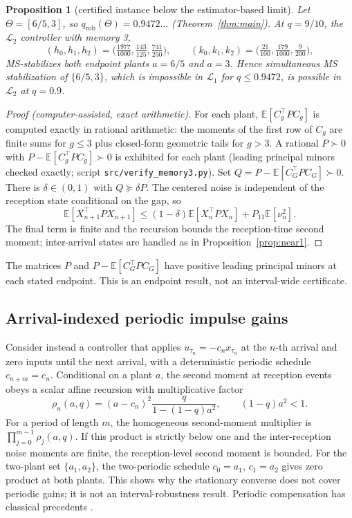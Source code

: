 \documentclass[preprint,12pt,numbers]{elsarticle}
\newtheorem{proposition}{Proposition}
\theoremstyle{definition}
\newcommand{\E}{\mathbb{E}}
\newcommand{\Lone}{\mathcal{L}_1}
\newcommand{\Ltwo}{\mathcal{L}_2}
\newcommand{\qrob}{q_{\mathrm{rob}}}
\begin{document}
\begin{proposition}[certified instance below the estimator-based limit]\label{prop:cert}
Let $\Theta=[6/5,3]$, so $\qrob(\Theta)=0.9472\ldots$ (Theorem~\ref{thm:main}). At $q=9/10$, the $\Ltwo$ controller with memory 3,
\[
(h_0,h_1,h_2)=\bigl(\tfrac{1977}{1000},\tfrac{143}{125},\tfrac{741}{250}\bigr),\qquad(k_0,k_1,k_2)=\bigl(\tfrac{21}{100},\tfrac{179}{1000},\tfrac{9}{200}\bigr),
\]
MS-stabilizes both endpoint plants $a=6/5$ and $a=3$. Hence simultaneous MS stabilization of $\{6/5,3\}$, which is impossible in $\Lone$ for $q\le0.9472$, is possible in $\Ltwo$ at $q=0.9$.
\end{proposition}
\begin{proof}[Proof (computer-assisted, exact arithmetic)]
For each plant, $\E[C_g^\top PC_g]$ is computed exactly in rational arithmetic: the moments of the first row of $C_g$ are finite sums for $g\le3$ plus closed-form geometric tails for $g>3$. A rational $P\succ0$ with $P-\E[C_g^\top PC_g]\succ0$ is exhibited for each plant (leading principal minors checked exactly; script \texttt{src/verify\_memory3.py}). Set $Q=P-\E[C_G^\top PC_G]\succ0$. There is $\delta\in(0,1)$ with $Q\succeq\delta P$. The centered noise is independent of the reception state conditional on the gap, so
\[
\E[X_{n+1}^\top PX_{n+1}]\le(1-\delta)\E[X_n^\top PX_n]+P_{11}\E[\nu_n^2].
\]
The final term is finite and the recursion bounds the reception-time second moment; inter-arrival states are handled as in Proposition~\ref{prop:near1}.
\end{proof}

The matrices $P$ and $P-\mathbb E[C_G^{\top}PC_G]$ have positive leading principal minors at each stated endpoint. This is an endpoint result, not an interval-wide certificate.
\subsection{Arrival-indexed periodic impulse gains}
Consider instead a controller that applies $u_{\tau_n}=-c_n x_{\tau_n}$ at the $n$-th arrival and zero inputs until the next arrival, with a deterministic periodic schedule $c_{n+m}=c_n$. Conditional on a plant $a$, the second moment at reception events obeys a scalar affine recursion with multiplicative factor
\[
\rho_n(a,q)=(a-c_n)^2\frac{q}{1-(1-q)a^2},\qquad (1-q)a^2<1.
\]
For a period of length $m$, the homogeneous second-moment multiplier is $\prod_{j=0}^{m-1}\rho_j(a,q)$. If this product is strictly below one and the inter-reception noise moments are finite, the reception-level second moment is bounded. For the two-plant set $\{a_1,a_2\}$, the two-periodic schedule $c_0=a_1$, $c_1=a_2$ gives zero product at both plants. This shows why the stationary converse does not cover periodic gains; it is not an interval-robustness result. Periodic compensation has classical precedents \citep{khargonekar1985periodic}.
\end{document}
